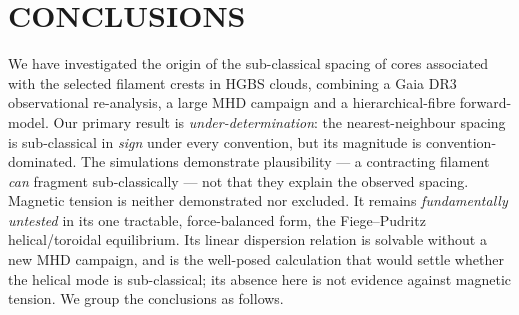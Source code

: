 \documentclass[usenatbib,twoside,twocolumn]{mnras}
\begin{document}
\section{CONCLUSIONS}

We have investigated the origin of the sub-classical spacing of cores associated with the selected filament crests in HGBS clouds, combining a Gaia DR3 observational re-analysis, a large MHD campaign and a hierarchical-fibre forward-model. Our primary result is \emph{under-determination}: the nearest-neighbour spacing is sub-classical in \emph{sign} under every convention, but its magnitude is convention-dominated. The simulations demonstrate plausibility --- a contracting filament \emph{can} fragment sub-classically --- not that they explain the observed spacing. Magnetic tension is neither demonstrated nor excluded. It remains \emph{fundamentally untested} in its one tractable, force-balanced form, the Fiege--Pudritz helical/toroidal equilibrium. Its linear dispersion relation is solvable without a new MHD campaign, and is the well-posed calculation that would settle whether the helical mode is sub-classical; its absence here is not evidence against magnetic tension. We group the conclusions as follows.
\end{document}
